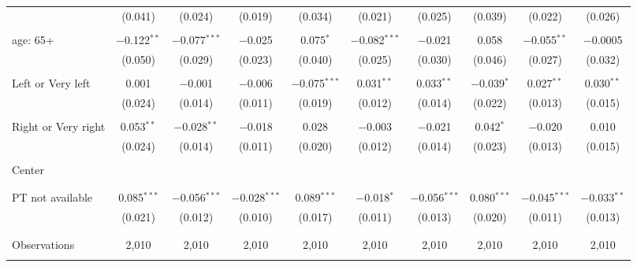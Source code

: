 \begin{tabular}{@{\extracolsep{5pt}}lccccccccc}
  & (0.041) & (0.024) & (0.019) & (0.034) & (0.021) & (0.025) & (0.039) & (0.022) & (0.026) \\ 
  & & & & & & & & & \\ 
 age: 65+ & $-$0.122$^{**}$ & $-$0.077$^{***}$ & $-$0.025 & 0.075$^{*}$ & $-$0.082$^{***}$ & $-$0.021 & 0.058 & $-$0.055$^{**}$ & $-$0.0005 \\ 
  & (0.050) & (0.029) & (0.023) & (0.040) & (0.025) & (0.030) & (0.046) & (0.027) & (0.032) \\ 
  & & & & & & & & & \\ 
 Left or Very left & 0.001 & $-$0.001 & $-$0.006 & $-$0.075$^{***}$ & 0.031$^{**}$ & 0.033$^{**}$ & $-$0.039$^{*}$ & 0.027$^{**}$ & 0.030$^{**}$ \\ 
  & (0.024) & (0.014) & (0.011) & (0.019) & (0.012) & (0.014) & (0.022) & (0.013) & (0.015) \\ 
  & & & & & & & & & \\ 
 Right or Very right & 0.053$^{**}$ & $-$0.028$^{**}$ & $-$0.018 & 0.028 & $-$0.003 & $-$0.021 & 0.042$^{*}$ & $-$0.020 & 0.010 \\ 
  & (0.024) & (0.014) & (0.011) & (0.020) & (0.012) & (0.014) & (0.023) & (0.013) & (0.015) \\ 
  & & & & & & & & & \\ 
 Center &  &  &  &  &  &  &  &  &  \\ 
  &  &  &  &  &  &  &  &  &  \\ 
  & & & & & & & & & \\ 
 PT not available & 0.085$^{***}$ & $-$0.056$^{***}$ & $-$0.028$^{***}$ & 0.089$^{***}$ & $-$0.018$^{*}$ & $-$0.056$^{***}$ & 0.080$^{***}$ & $-$0.045$^{***}$ & $-$0.033$^{**}$ \\ 
  & (0.021) & (0.012) & (0.010) & (0.017) & (0.011) & (0.013) & (0.020) & (0.011) & (0.013) \\ 
  & & & & & & & & & \\ 
\hline \\[-1.8ex] 

Observations & 2,010 & 2,010 & 2,010 & 2,010 & 2,010 & 2,010 & 2,010 & 2,010 & 2,010 \\ 
\hline 
\hline \\[-1.8ex] 
\end{tabular} 